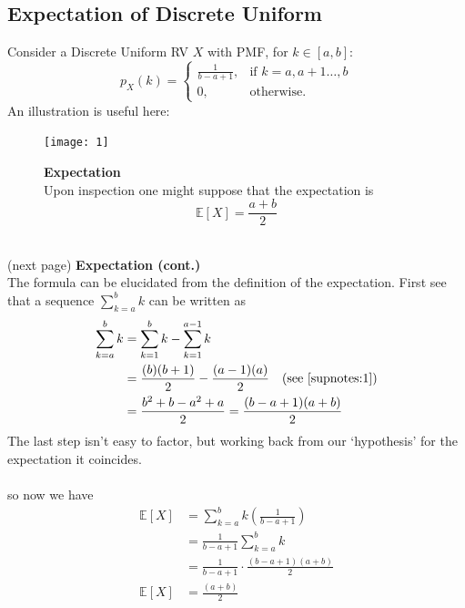\documentclass{report}
\begin{document}
\subsection{Expectation of Discrete Uniform}
Consider a Discrete Uniform RV $X$ with PMF, for $k\in[a,b]$:
\begin{equation*}
p_X(k)=\begin{cases}
\frac{1}{b-a+1},&\text{if }k=a,a+1\ldots,b\\
0,&\text{otherwise}.
\end{cases}
\end{equation*}
An illustration is useful here:
\begin{figure}[h]
\begin{center}
\texttt{[image: 1]}\\
\end{center}
\textbf{Expectation}\\
Upon inspection one might suppose that the expectation is
\begin{equation*}
\mathbb{E}[X]=\frac{a+b}{2}
\end{equation*}
\end{figure}\\
(next page)
\newpage
\noindent\textbf{Expectation (cont.)}\\
The formula can be elucidated from the definition of the expectation. First see that a sequence
$\sum^b_{k=a}k$ can be written as
\begin{align*}
\sum^b_{k=a}k&=\sum^b_{k=1}k-\sum^{a-1}_{k=1}k\\
&=\frac{(b)(b+1)}{2}-\frac{(a-1)(a)}{2}\quad\text{(see \ref{supnotes:1})}\\
&=\frac{b^2+b-a^2+a}{2}=\frac{(b-a+1)(a+b)}{2}
\end{align*}
The last step isn't easy to factor, but working back from our `hypothesis' for the expectation it coincides.\\
\vspace{1mm}\\
so now we have
\begin{align*}
\mathbb{E}[X]&=\sum^b_{k=a}k\left(\frac{1}{b-a+1}\right)\\
&=\frac{1}{b-a+1}\sum^b_{k=a}k\\
&=\frac{1}{b-a+1}\cdot\frac{(b-a+1)(a+b)}{2}\\
\mathbb{E}[X]&=\frac{(a+b)}{2}
\end{align*}
\newpage
\end{document}
